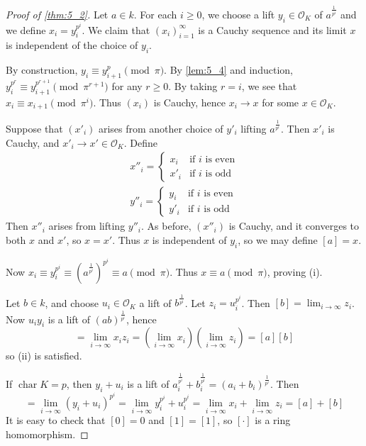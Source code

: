 \documentclass[11pt]{article}
\theoremstyle{definition}
\theoremstyle{plain}
\theoremstyle{remark}
\DeclareMathOperator{\Char}{char}
\newcommand{\cO}{\mathcal{O}}
\begin{document}
\begin{proof}[Proof of \autoref{thm:5_2}]
    Let $a \in k$. For each $i \ge 0$, we choose a lift $y_i \in \cO_K$ of $a^{\frac{1}{p^i}}$ and we define $x_i = y_i^{p^i}$. We claim that $(x_i)_{i=1}^\infty$ is a Cauchy sequence and its limit $x$ is independent of the choice of $y_i$.

    By construction, $y_i \equiv y_{i+1}^p \pmod{\pi}$. By \autoref{lem:5_4} and induction, $y_i^{p^r} \equiv y_{i+1}^{p^{r+1}} \pmod{\pi^{r+1}}$ for any $r \ge 0$. By taking $r = i$, we see that $x_i \equiv x_{i+1} \pmod{\pi^i}$. Thus $(x_i)$ is Cauchy, hence $x_i \to x$ for some $x \in \cO_K$.

    Suppose that $(x'_i)$ arises from another choice of $y'_i$ lifting $a^\frac{1}{p^i}$. Then $x'_i$ is Cauchy, and $x'_i \to x' \in \cO_K$. Define
    \begin{gather*}
        x''_i = \begin{cases}
            x_i & \text{if } i \text{ is even}\\
            x'_i & \text{if } i \text{ is odd}
        \end{cases}\\
        y''_i = \begin{cases}
            y_i & \text{if } i \text{ is even}\\
            y'_i & \text{if } i \text{ is odd}
        \end{cases}
    \end{gather*}
    Then $x''_i$ arises from lifting $y''_i$. As before, $(x''_i)$ is Cauchy, and it converges to both $x$ and $x'$, so $x = x'$. Thus $x$ is independent of $y_i$, so we may define $[a] = x$.

    Now $x_i \equiv y_i^{p^i} \equiv (a^\frac{1}{p^i})^{p^i} \equiv a \pmod{\pi}$. Thus $x \equiv a \pmod{\pi}$, proving (i).

    Let $b \in k$, and choose $u_i \in \cO_K$ a lift of $b^\frac{1}{p^i}$. Let $z_i = u_i^{p^i}$. Then $[b] = \lim_{i \to \infty} z_i$. Now $u_i y_i$ is a lift of $(a b)^\frac{1}{p^i}$, hence
    \begin{equation*}
        [a b] = \lim_{i \to \infty} x_i z_i = \left(\lim_{i \to \infty} x_i\right) \left(\lim_{i \to \infty} z_i\right) = [a] [b]
    \end{equation*}
    so (ii) is satisfied.

    If $\Char K = p$, then $y_i + u_i$ is a lift of $a_i^\frac{1}{p^i} + b_i^\frac{1}{p^i} = (a_i + b_i)^\frac{1}{p^i}$. Then
    \begin{equation*}
        [a + b] = \lim_{i \to \infty}(y_i + u_i)^{p^i} = \lim_{i \to \infty} y_i^{p^i} + u_i^{p^i} = \lim_{i \to \infty} x_i + \lim_{i \to \infty} z_i = [a] + [b]
    \end{equation*}
    It is easy to check that $[0] = 0$ and $[1] = [1]$, so $[\cdot]$ is a ring homomorphism.


\end{proof}
\end{document}
